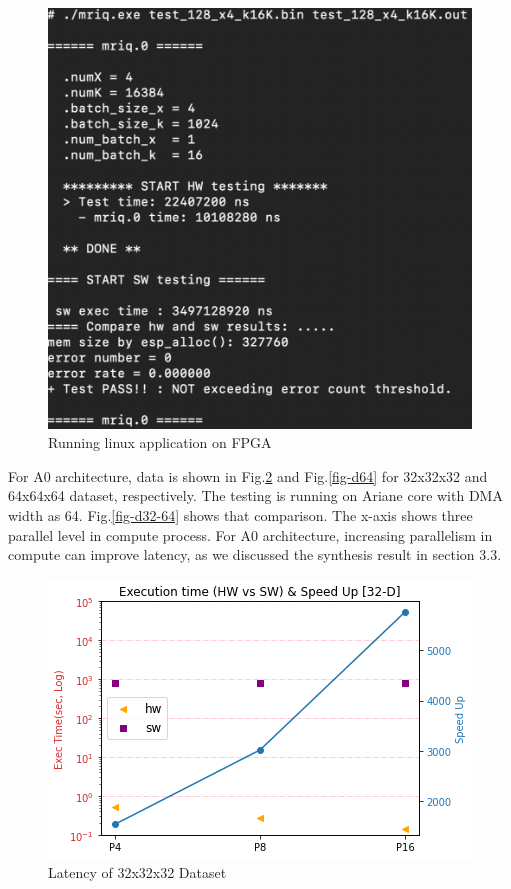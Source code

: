 \documentclass{sig-alternate}
\begin{document}
\begin{figure}[h!]
    \centering
    \includegraphics[width=0.85\columnwidth]{figure/fpga-proto.png}
    \caption{Running linux application on FPGA}
    \label{fig-f}
\end{figure}

For A0 architecture, data is shown in Fig.\ref{fig-d32} and Fig.\ref{fig-d64} for 32x32x32 and 64x64x64 dataset, respectively. The testing is running on Ariane core with DMA width as 64. Fig.\ref{fig-d32-64} shows that comparison. The x-axis shows three parallel level in compute process. For A0 architecture, increasing parallelism in compute can improve latency, as we discussed the synthesis result in section 3.3. 


\begin{figure}[h!]
    \centering
    \includegraphics[width=0.85\columnwidth]{figure/D32-SW-HW.png}
    \caption{Latency of 32x32x32 Dataset}
    \label{fig-d32}
\end{figure}
\end{document}
